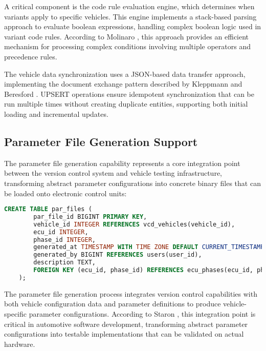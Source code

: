     A critical component is the code rule evaluation engine, which determines when variants apply to specific vehicles. This engine implements a stack-based parsing approach to evaluate boolean expressions, handling complex boolean logic used in variant code rules. According to Molinaro \cite{molinaro2005sql}, this approach provides an efficient mechanism for processing complex conditions involving multiple operators and precedence rules.
    
    The vehicle data synchronization uses a JSON-based data transfer approach, implementing the document exchange pattern described by Kleppmann and Beresford \cite{kleppmann2017conflict}. UPSERT operations ensure idempotent synchronization that can be run multiple times without creating duplicate entities, supporting both initial loading and incremental updates.
    
    \subsection{Parameter File Generation Support}
    \label{subsec:par-file-generation}
    
    The parameter file generation capability represents a core integration point between the version control system and vehicle testing infrastructure, transforming abstract parameter configurations into concrete binary files that can be loaded onto electronic control units:
    
    \begin{lstlisting}[language=SQL, caption={Parameter File Generation Records}, label={lst:par-file-records}]
    CREATE TABLE par_files (
        par_file_id BIGINT PRIMARY KEY,
        vehicle_id INTEGER REFERENCES vcd_vehicles(vehicle_id),
        ecu_id INTEGER,
        phase_id INTEGER,
        generated_at TIMESTAMP WITH TIME ZONE DEFAULT CURRENT_TIMESTAMP,
        generated_by BIGINT REFERENCES users(user_id),
        description TEXT,
        FOREIGN KEY (ecu_id, phase_id) REFERENCES ecu_phases(ecu_id, phase_id)
    );
    \end{lstlisting}
    
    The parameter file generation process integrates version control capabilities with both vehicle configuration data and parameter definitions to produce vehicle-specific parameter configurations. According to Staron \cite{staron2021automotive}, this integration point is critical in automotive software development, transforming abstract parameter configurations into testable implementations that can be validated on actual hardware.
    
